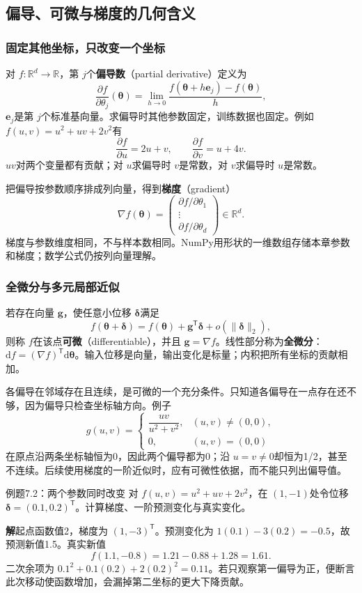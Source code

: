 \documentclass[UTF8,fontset=none,zihao=-4,a4paper]{ctexart}
\newcommand{\term}[1]{\textbf{#1}}
\newcommand{\sol}{\par\noindent\textbf{解}\quad}
\newcommand{\code}[1]{\texttt{\detokenize{#1}}}
\numberwithin{equation}{section}
\numberwithin{figure}{section}
\begin{document}
\subsection{偏导、可微与梯度的几何含义}
\subsubsection{固定其他坐标，只改变一个坐标}
对 $f:\mathbb R^d\to\mathbb R$，第 $j$个\term{偏导数}（partial derivative）定义为
\[
 \frac{\partial f}{\partial\theta_j}(\symbf\theta)
 =\lim_{h\to0}\frac{f(\symbf\theta+h\symbf e_j)-f(\symbf\theta)}h,
\]
$\symbf e_j$是第 $j$个标准基向量。求偏导时其他参数固定，训练数据也固定。例如 $f(u,v)=u^2+uv+2v^2$有
\[
 \frac{\partial f}{\partial u}=2u+v,\qquad
 \frac{\partial f}{\partial v}=u+4v.
\]
$uv$对两个变量都有贡献；对 $u$求偏导时 $v$是常数，对 $v$求偏导时 $u$是常数。

把偏导按参数顺序排成列向量，得到\term{梯度}（gradient）
\[
 \nabla f(\symbf\theta)=
 \begin{pmatrix}\partial f/\partial\theta_1\\\vdots\\\partial f/\partial\theta_d\end{pmatrix}
 \in\mathbb R^d.
\]
梯度与参数维度相同，不与样本数相同。NumPy用形状\code{(d,)}的一维数组存储本章参数和梯度；数学公式仍按列向量理解。

\subsubsection{全微分与多元局部近似}
若存在向量 $\symbf g$，使任意小位移 $\symbf\delta$满足
\[
 f(\symbf\theta+\symbf\delta)
 =f(\symbf\theta)+\symbf g^{\mathsf T}\symbf\delta
 +o(\|\symbf\delta\|_2),
\]
则称 $f$在该点\term{可微}（differentiable），并且 $\symbf g=\nabla f$。线性部分称为\term{全微分}：$\mathrm df=(\nabla f)^{\mathsf T}\mathrm d\symbf\theta$。输入位移是向量，输出变化是标量；内积把所有坐标的贡献相加。

各偏导在邻域存在且连续，是可微的一个充分条件。只知道各偏导在一点存在还不够，因为偏导只检查坐标轴方向。例子
\[
 g(u,v)=\begin{cases}\dfrac{uv}{u^2+v^2},&(u,v)\ne(0,0),\\0,&(u,v)=(0,0)\end{cases}
\]
在原点沿两条坐标轴恒为0，因此两个偏导都为0；沿 $u=v\ne0$却恒为1/2，甚至不连续。后续使用梯度的一阶近似时，应有可微性依据，而不能只列出偏导值。

\begin{infobox}{例题7.2：两个参数同时改变}
对 $f(u,v)=u^2+uv+2v^2$，在 $(1,-1)$处令位移 $\symbf\delta=(0.1,0.2)^{\mathsf T}$。计算梯度、一阶预测变化与真实变化。
\end{infobox}
\sol 起点函数值2，梯度为 $(1,-3)^{\mathsf T}$。预测变化为 $1(0.1)-3(0.2)=-0.5$，故预测新值1.5。真实新值
\[
 f(1.1,-0.8)=1.21-0.88+1.28=1.61.
\]
二次余项为 $0.1^2+0.1(0.2)+2(0.2)^2=0.11$。若只观察第一偏导为正，便断言此次移动使函数增加，会漏掉第二坐标的更大下降贡献。
\end{document}
